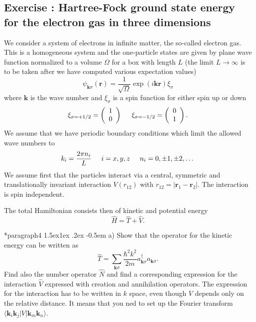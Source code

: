 \documentclass[%
oneside,                 %
final,                   %
10pt]{article}
\makeatletter
\newenvironment{doconceexercise}{}{}
\newcounter{doconceexercisecounter}
\newcommand\subex{\@startsection*{paragraph}{4}{\z@}%
                  {1.5ex\@plus1ex \@minus.2ex}%
                  {-0.5em}%
                  {\normalfont\normalsize\bfseries}}
\makeatother
\begin{document}
\begin{doconceexercise}

\subsection*{Exercise \thedoconceexercisecounter: Hartree-Fock ground state energy for the  electron gas in three dimensions}


We consider a system of electrons in infinite matter, the so-called electron gas. This is a homogeneous system and the one-particle states are given by plane wave function normalized to a volume $\Omega$ 
for a box with length $L$ (the limit $L\rightarrow \infty$ is to be taken after we have computed various expectation values)
\[
\psi_{\mathbf{k}\sigma}(\mathbf{r})= \frac{1}{\sqrt{\Omega}}\exp{(i\mathbf{kr})}\xi_{\sigma}
\]
where $\mathbf{k}$ is the wave number and  $\xi_{\sigma}$ is a spin function for either spin up or down
\[ 
\xi_{\sigma=+1/2}=\left(\begin{array}{c} 1 \\ 0 \end{array}\right) \hspace{0.5cm}
\xi_{\sigma=-1/2}=\left(\begin{array}{c} 0 \\ 1 \end{array}\right).
\]
We assume that we have periodic boundary conditions which limit the allowed wave numbers to
\[
k_i=\frac{2\pi n_i}{L}\hspace{0.5cm} i=x,y,z \hspace{0.5cm} n_i=0,\pm 1,\pm 2, \dots
\]
We assume first that the particles interact via a central, symmetric and translationally invariant
interaction  $V(r_{12})$ with
$r_{12}=|\mathbf{r}_1-\mathbf{r}_2|$.  The interaction is spin independent.

The total Hamiltonian consists then of kinetic and potential energy
\[
\hat{H} = \hat{T}+\hat{V}.
\]


\subex{a)}
Show that the operator for the kinetic energy can be written as
\[
\hat{T}=\sum_{\mathbf{k}\sigma}\frac{\hbar^2k^2}{2m}a_{\mathbf{k}\sigma}^{\dagger}a_{\mathbf{k}\sigma}.
\]
Find also the number operator $\hat{N}$ and find a corresponding expression for the interaction
$\hat{V}$ expressed with creation and annihilation operators.   The expression for the interaction
has to be written in  $k$ space, even though $V$ depends only on the relative distance. It means that you ned to set up the Fourier transform $\langle \mathbf{k}_i\mathbf{k}_j| V | \mathbf{k}_m\mathbf{k}_n\rangle$.


\end{doconceexercise}
\end{document}
